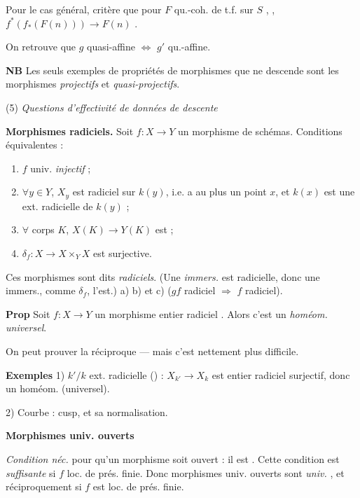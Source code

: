 \documentclass[11pt,a4paper]{article}
\begin{document}
Pour le cas général,  critère que pour $F$ qu.-coh. de t.f. sur $S$ , , $f^*(f_*(F(n))) \to F(n)$ .

On retrouve que $g$ quasi-affine $\Longleftrightarrow$ $g'$ qu.-affine.

\textbf{NB} Les seuls exemples de propriétés de morphismes que  ne descende  \ill{} sont les morphismes \emph{projectifs} et \emph{quasi-projectifs}.

(5) \emph{Questions d'effectivité de données de descente}

\textbf{Morphismes radiciels.} Soit $f : X \to Y$ un morphisme de schémas. Conditions équivalentes :

\begin{enumerate}
  \item[a)] $f$ univ. \emph{injectif} ;
  \item[b)] $\forall y \in Y$, $X_y$ est radiciel sur $k(y)$, i.e. \struck{\ill{}} a au plus un point $x$, et $k(x)$ est une ext. radicielle de $k(y)$ ;
  \item[c)] $\forall$ corps $K$, $X(K) \to Y(K)$ est \emph{} ;
  \item[d)] $\delta_f : X \to X \times_Y X$ est surjective.
\end{enumerate}

Ces morphismes sont dits \emph{radiciels}. (Une \emph{immers.} est radicielle, donc une immers., comme $\delta_f$, l'est.)  a) b) et c) ($gf$ radiciel $\Rightarrow$ $f$ radiciel).

\textbf{Prop} Soit $f : X \to Y$ un morphisme entier radiciel . Alors c'est un \emph{homéom.} \struck{\ill{}} \emph{universel}.

On peut prouver la réciproque --- mais c'est nettement plus difficile.

\textbf{Exemples} 1) $k'/k$ ext. radicielle () : $X_{k'} \to X_k$ est entier radiciel surjectif, donc un homéom. (universel).

2) Courbe : cusp, et sa normalisation.

\textbf{Morphismes univ. ouverts}

\emph{Condition néc.} pour qu'un morphisme soit ouvert : il est \emph{}. Cette condition est \emph{suffisante} si $f$ loc. de prés. finie. Donc morphismes univ. ouverts sont \emph{univ. }, et réciproquement si $f$ est loc. de prés. finie.
\end{document}
